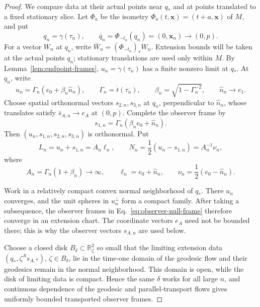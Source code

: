 \documentclass[10pt]{article}
\begin{document}
\begin{proof}
We compare data at their actual points near \(q_*\) and at points
translated to a fixed stationary slice.  Let \(\Phi_a\) be the isometry
\(\Phi_a(t,\boldsymbol{x})=(t+a,\boldsymbol{x})\) of \(M\), and put
\begin{equation}
  q_n=\gamma(\tau_n),\qquad
  \bar q_n=\Phi_{-t_n}(q_n)=(0,\boldsymbol{x}_n)\longrightarrow(0,p).
  \label{eq:actual-translated-points}
\end{equation}
For a vector \(W_n\) at \(q_n\), write
\(\bar W_n=(\Phi_{-t_n})_*W_n\).  Extension bounds will be taken at the
actual points \(q_n\); stationary translations are used only within \(M\).
By Lemma~\ref{lem:endpoint-frames}, \(u_n=\dot\gamma(\tau_n)\) has a finite
nonzero limit at \(q_*\).  At \(q_n\), write
\begin{equation}
  u_n=\Gamma_n(e_0+\beta_n\widehat n_n),
  \qquad
  \Gamma_n=\dot t(\tau_n),\qquad
  \beta_n=\sqrt{1-\Gamma_n^{-2}},\qquad
  \widehat n_n\longrightarrow e_1 .
  \label{eq:exit-boost-form}
\end{equation}
Choose spatial orthonormal vectors \(s_{2,n},s_{3,n}\) at \(q_n\),
perpendicular to \(\widehat n_n\), whose translates satisfy
\(\bar s_{A,n}\to e_A\) at \((0,p)\).  Complete the observer frame by
\begin{equation}
  s_{1,n}=\Gamma_n(\beta_ne_0+\widehat n_n).
\end{equation}
Then \((u_n,s_{1,n},s_{2,n},s_{3,n})\) is orthonormal.  Put
\begin{equation}
  L_n=u_n+s_{1,n}=A_n\ell_n,
  \qquad
  N_n=\frac12(u_n-s_{1,n})=A_n^{-1}\nu_n,
  \label{eq:observer-null-frame}
\end{equation}
where
\begin{equation}
  A_n=\Gamma_n(1+\beta_n)\longrightarrow\infty,\qquad
  \ell_n=e_0+\widehat n_n,\qquad
  \nu_n=\frac12(e_0-\widehat n_n).
\end{equation}

Work in a relatively compact convex normal neighborhood of \(q_*\).
There \(u_n\) converges, and the unit spheres in \(u_n^\perp\) form a compact
family.  After taking a
subsequence, the observer frames in Eq.~\eqref{eq:observer-null-frame}
therefore converge in an extension chart.  The coordinate vectors \(e_A\)
need not be bounded there; this is why the observer vectors \(s_{A,n}\) are
used below.

Choose a closed disk \(B_\delta\subset\mathbb R^2_\zeta\) so small that the
limiting extension data \((q_*,\zeta^As_{A,*})\), \(\zeta\in B_\delta\), lie
in the time-one domain of the geodesic flow and their geodesics remain in the
normal neighborhood.  This domain is open, while the disk of limiting data is
compact.  Hence the same \(\delta\) works for all large \(n\), and continuous
dependence of the geodesic and parallel-transport flows gives uniformly
bounded transported observer frames.


\end{proof}
\end{document}
